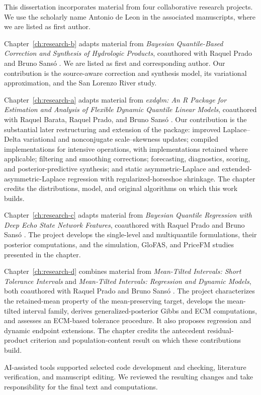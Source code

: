 \begin{acknowledgements}

This dissertation incorporates material from four collaborative research
projects. We use the scholarly name Antonio de Leon in the associated
manuscripts, where we are listed as first author.

Chapter~\ref{ch:research-b} adapts material from \emph{Bayesian Quantile-Based
Correction and Synthesis of Hydrologic Products}, coauthored with Raquel Prado
and Bruno Sans\'o \citep{qdesn-DeLeonPradoSanso2026HydrologicProducts}. We are
listed as first and corresponding author. Our contribution is the source-aware
correction and synthesis model, its variational approximation, and the San
Lorenzo River study.

Chapter~\ref{ch:research-a} adapts material from \emph{exdqlm: An R Package for
Estimation and Analysis of Flexible Dynamic Quantile Linear Models}, coauthored
with Raquel Barata, Raquel Prado, and Bruno Sans\'o
\citep{env-deleon2026exdqlm}. Our contribution is the substantial later
restructuring and extension of the  package: improved Laplace--Delta
variational and nonconjugate scale--skewness updates; compiled implementations
for intensive operations, with  implementations retained where
applicable; filtering and smoothing corrections; forecasting, diagnostics,
scoring, and posterior-predictive synthesis; and static asymmetric-Laplace and
extended-asymmetric-Laplace regression with regularized-horseshoe shrinkage.
The chapter credits the distributions, model, and original algorithms on which
this work builds.

Chapter~\ref{ch:research-c} adapts material from \emph{Bayesian Quantile
Regression with Deep Echo State Network Features}, coauthored with Raquel Prado
and Bruno Sans\'o \citep{qdesn-deleon2026qdesn}. The project develops the
single-level and multiquantile formulations, their posterior computations, and
the simulation, GloFAS, and PriceFM studies presented in the chapter.

Chapter~\ref{ch:research-d} combines material from \emph{Mean-Tilted Intervals:
Short Tolerance Intervals} and \emph{Mean-Tilted Intervals: Regression and
Dynamic Models}, both coauthored with Raquel Prado and Bruno Sans\'o
\citep{rqr-deleon2026short,rqr-deleon2026extensions}. The project characterizes
the retained-mean property of the mean-preserving target, develops the
mean-tilted interval family, derives generalized-posterior Gibbs and ECM
computations, and assesses an ECM-based tolerance procedure. It also proposes
regression and dynamic endpoint
extensions. The chapter credits the antecedent residual-product criterion and
population-content result on which these contributions build.

AI-assisted tools supported selected code development and checking,
literature verification, and manuscript editing. We reviewed the resulting
changes and take responsibility for the final text and computations.

\end{acknowledgements}
